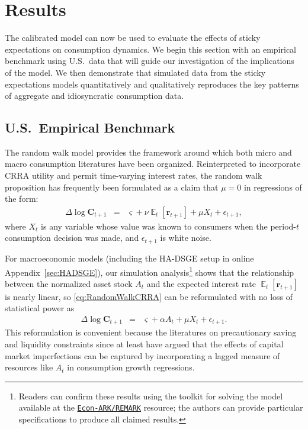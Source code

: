 \documentclass[titlepage]{article}
\DeclareMathOperator{\Ex}{\mathbb{E}} %
\begin{document}
\section{Results}\label{sec:Results}

The calibrated model can now be used to evaluate the effects of sticky expectations on consumption dynamics.  We begin this section with an empirical benchmark using U.S.\ data that will guide our investigation of the implications of the model.  We then demonstrate that simulated data from the sticky expectations models quantitatively and qualitatively reproduces the key patterns of aggregate and idiosyncratic consumption data.

\subsection{U.S.\ Empirical Benchmark}
\label{sec:EmpBenchmark}

The random walk model provides the framework around which both micro and macro consumption literatures have been organized.  Reinterpreted to incorporate CRRA utility and permit time-varying interest rates, the random walk proposition has frequently been formulated as a claim that $\mu=0$ in regressions of the form:
\begin{eqnarray}
  \label{eq:RandomWalkCRRA}
  \Delta \log \mathbf{C}_{t+1} & = & \varsigma+\nu \Ex_{t}[\mathbf{r}_{t+1}]+\mu X_{t}+\epsilon_{t+1},
\end{eqnarray}
where $X_{t}$ is any variable whose value was known to consumers
when the period-$t$ consumption decision was made, and $\epsilon_{t+1}$
is white noise.

For macroeconomic models (including the HA-DSGE setup in online Appendix~\ref{sec:HADSGE}), our simulation analysis\footnote{Readers can confirm these results using the toolkit for solving the model available at the \href{https://github.com/econ-ark/REMARK/tree/master/REMARKs/cAndCwithStickyE}{\texttt{Econ-ARK/REMARK}} resource; the authors can provide particular specifications to produce all claimed results.}
shows that the relationship between the normalized asset stock $A_{t}$ and the expected interest rate $\Ex_{t}[\mathbf{r}_{t+1}]$ is nearly linear, so \eqref{eq:RandomWalkCRRA} can be reformulated with no loss of statistical power as
\begin{eqnarray*}
  \label{eq:RandomWalkAForm}
  \Delta \log \mathbf{C}_{t+1} & = & \varsigma+\alpha A_{t}+\mu X_{t}+\epsilon_{t+1}.
\end{eqnarray*}
This reformulation is convenient because the literatures on precautionary saving and liquidity constraints since at least \cite{zeldes:jpe,zeldesStochastic} have argued that the effects of capital market imperfections can be captured by incorporating a lagged measure of resources like $A_{t}$ in consumption growth regressions.
\end{document}
